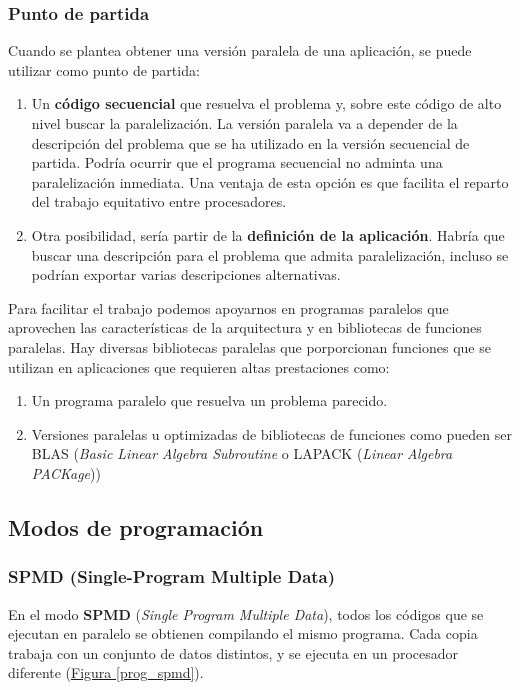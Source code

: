 \documentclass[10pt,a4paper,spanish]{report}
\begin{document}
\textcolor[rgb]{0.2,0.4,0.8}{\subsubsection{Punto de partida}}
Cuando se plantea obtener una versión paralela de una aplicación, se puede utilizar como punto de partida:
\begin{enumerate}[\color{azul}{\bf $\heartsuit$}]
    \item Un \textbf{\textcolor[rgb]{0.2,0.4,0.8}{código secuencial}} que resuelva el problema y, sobre este código de alto nivel buscar la paralelización.  La versión paralela va a depender de la descripción del problema que se ha utilizado en la versión secuencial de partida. Podría ocurrir que el programa secuencial no adminta una paralelización inmediata. Una ventaja de esta opción es que facilita el reparto del trabajo equitativo entre procesadores. 
    \item Otra posibilidad, sería partir de la \textbf{\textcolor[rgb]{0.2,0.4,0.8}{definición de la aplicación}}. Habría que buscar una descripción para el problema que admita paralelización, incluso se podrían exportar varias descripciones alternativas.
\end{enumerate}

Para facilitar el trabajo podemos apoyarnos en programas paralelos que aprovechen las características de la arquitectura y en bibliotecas de funciones paralelas. Hay diversas bibliotecas paralelas que porporcionan funciones que se utilizan en aplicaciones que requieren altas prestaciones como:
\begin{enumerate}[\color{azul}{\bf $\heartsuit$}]
    \item Un programa paralelo que resuelva un problema parecido.
    \item Versiones paralelas u optimizadas de bibliotecas de funciones como pueden ser BLAS (\textit{\textcolor[rgb]{0.2,0.4,0.8}{Basic Linear Algebra Subroutine}} o LAPACK (\textcolor[rgb]{0.2,0.4,0.8}{\textit{Linear Algebra PACKage}}))
\end{enumerate}

\textcolor[rgb]{0.2,0.4,0.8}{\subsection{Modos de programación}}
\textcolor[rgb]{0.2,0.4,0.8}{\subsubsection{SPMD (Single-Program Multiple Data)}}
En el modo \textbf{\textcolor[rgb]{0.2,0.4,0.8}{SPMD}} (\textit{\textcolor[rgb]{0.2,0.4,0.8}{Single Program Multiple Data}}), todos los códigos que se ejecutan en paralelo se obtienen compilando el mismo programa. Cada copia trabaja con un conjunto de datos distintos, y se ejecuta en un procesador diferente (\hyperref[prog_spmd]{Figura \ref*{prog_spmd}}).
\end{document}
